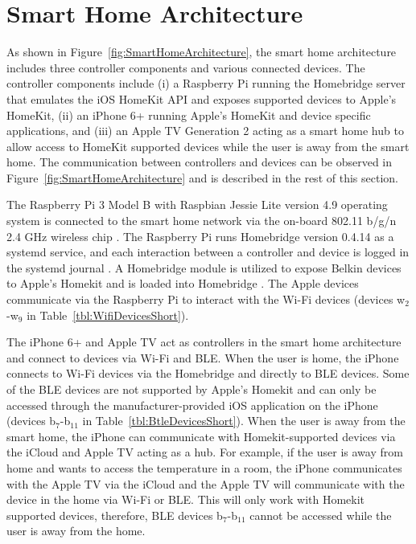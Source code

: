 \documentclass[conference]{./IEEEtran/IEEEtran}
\begin{document}
\section{Smart Home Architecture}\label{smartHome}
As shown in Figure~\ref{fig:SmartHomeArchitecture}, the smart home architecture includes three controller components and various connected devices. The controller components include (i) a Raspberry Pi running the Homebridge server that emulates the iOS HomeKit \ac{API} and exposes supported devices to Apple's HomeKit, (ii) an iPhone 6+ running Apple's HomeKit and device specific applications, and (iii) an Apple TV Generation 2 acting as a smart home hub to allow access to HomeKit supported devices while the user is away from the smart home. The communication between controllers and devices can be observed in Figure~\ref{fig:SmartHomeArchitecture} and is described in the rest of this section.

The Raspberry Pi 3 Model B with Raspbian Jessie Lite version 4.9 operating system is connected to the smart home network via the on-board 802.11 b/g/n 2.4 GHz wireless chip \cite{rasbperry}. The Raspberry Pi runs Homebridge version 0.4.14 as a systemd service, and each interaction between a controller and device is logged in the systemd journal \cite{homebridge}. A Homebridge module is utilized to expose Belkin devices to Apple's Homekit and is loaded into Homebridge \cite{wemo}. The Apple devices communicate via the Raspberry Pi to interact with the Wi-Fi devices (devices w$ _2 $-w$ _9 $ in Table~\ref{tbl:WifiDevicesShort}).

The iPhone 6+ and Apple TV act as controllers in the smart home architecture and connect to devices via Wi-Fi and \ac{BLE}. When the user is home, the iPhone connects to Wi-Fi devices via the Homebridge and directly to \ac{BLE} devices. Some of the \ac{BLE} devices are not supported by Apple's Homekit and can only be accessed through the manufacturer-provided iOS application on the iPhone (devices b$ _7 $-b$ _{11} $ in Table~\ref{tbl:BtleDevicesShort}). When the user is away from the smart home, the iPhone can communicate with Homekit-supported devices via the iCloud and Apple TV acting as a hub. For example, if the user is away from home and wants to access the temperature in a room, the iPhone communicates with the Apple TV via the iCloud and the Apple TV will communicate with the device in the home via Wi-Fi or \ac{BLE}. This will only work with Homekit supported devices, therefore, \ac{BLE} devices b$ _7 $-b$ _{11} $ cannot be accessed while the user is away from the home. 
\end{document}
